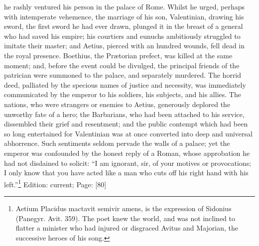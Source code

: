 he rashly ventured his person in the palace of Rome. Whilst he urged, perhaps with intemperate vehemence, the marriage of his son, Valentinian, drawing his sword, the first sword he had ever drawn, plunged it in the breast of a general who had saved his empire; his courtiers and eunuchs ambitiously struggled to imitate their master; and Aetius, pierced with an hundred wounds, fell dead in the royal presence. Boethius, the Prætorian prefect, was killed at the same moment; and, before the event could be divulged, the principal friends of the patrician were summoned to the palace, and separately murdered. The horrid deed, palliated by the specious names of justice and necessity, was immediately communicated by the emperor to his soldiers, his subjects, and his allies. The nations, who were strangers or enemies to Aetius, generously deplored the unworthy fate of a hero; the Barbarians, who had been attached to his service, dissembled their grief and resentment; and the public contempt which had been so long entertained for Valentinian was at once converted into deep and universal abhorrence. Such sentiments seldom pervade the walls of a palace; yet the emperor was confounded by the honest reply of a Roman, whose approbation he had not disdained to solicit: \texthebrew{“}I am ignorant, sir, of your motives or provocations; I only know that you have acted like a man who cuts off his right hand with his left.\texthebrew{}”\footnote{Aetium Placidus mactavit semivir amens, is the expression of Sidonius (Panegyr. Avit. 359). The poet knew the world, and was not inclined to flatter a minister who had injured or disgraced Avitus and Majorian, the successive heroes of his song.}
Edition: current; Page: [80]

